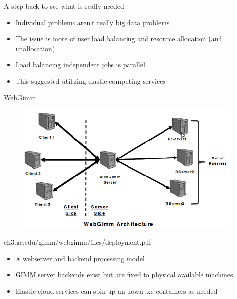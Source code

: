 \documentclass{beamer}
\begin{document}
 
\begin{frame}{A step back to see what is really needed}
 \begin{itemize}
  \item Individual problems aren't really big data problems
  \item The issue is more of user load balancing and resource allocation (and unallocation)
  \item Load balancing independent jobs is parallel
  \item This suggested utilizing elastic computing services
 \end{itemize}
\end{frame}

\begin{frame}{WebGimm}
 \begin{figure}
  \centering \includegraphics[scale=.30]{doc/webgimm}
\end{figure}
eh3.uc.edu/gimm/webgimm/files/deployment.pdf
 \begin{itemize}
  \item A webserver and backend processing model
  \item GIMM server backends exist but are fixed to physical available machines
  \item Elastic cloud services can spin up an down lxc containers as needed
 \end{itemize}
 \end{frame}
 
\end{document}
